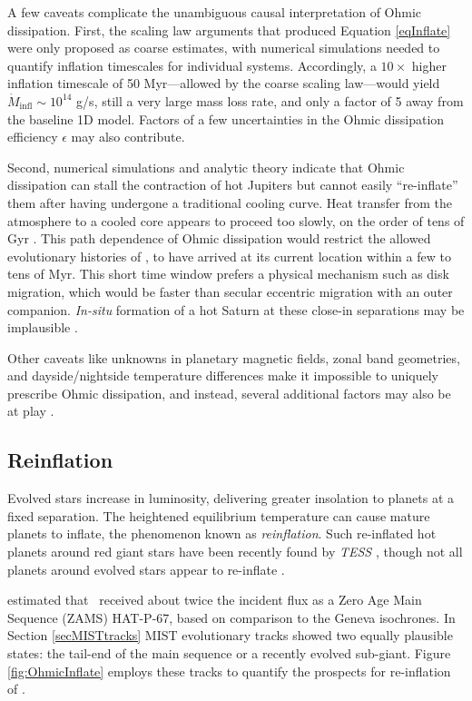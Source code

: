 \documentclass[linenumbers, twocolumn, trackchanges]{aastex631}
\newcommand{\hatpb}{\object{HAT-P-67 b}}
\begin{document}
A few caveats complicate the unambiguous causal interpretation of Ohmic dissipation.  First, the scaling law arguments that produced Equation \ref{eqInflate} were only proposed as coarse estimates, with numerical simulations needed to quantify inflation timescales for individual systems.  Accordingly, a $10\times$ higher inflation timescale of 50 Myr---allowed by the coarse scaling law---would yield $\dot{M}_\mathrm{infl}\sim10^{14}$ g/s, still a very large mass loss rate, and only a factor of 5 away from the baseline 1D model.  Factors of a few uncertainties in the Ohmic dissipation efficiency $\epsilon$ may also contribute.

Second, numerical simulations \citep{2013ApJ...763...13W} and analytic theory \citep{2016ApJ...819..116G} indicate that Ohmic dissipation can stall the contraction of hot Jupiters but cannot easily ``re-inflate'' them after having undergone a traditional cooling curve.  Heat transfer from the atmosphere to a cooled core appears to proceed too slowly, on the order of tens of Gyr \citep{2016ApJ...819..116G}.  This path dependence of Ohmic dissipation would restrict the allowed evolutionary histories of \hatpb, to have arrived at its current location within a few to tens of Myr.  This short time window prefers a physical mechanism such as disk migration, which would be faster than secular eccentric migration with an outer companion. \emph{In-situ} formation of a hot Saturn at these close-in separations may be implausible \citep{2018ARA&A..56..175D}.

Other caveats like unknowns in planetary magnetic fields, zonal band geometries, and dayside/nightside temperature differences make it impossible to uniquely prescribe Ohmic dissipation, and instead, several additional factors may also be at play \citep{2021A&A...645A..79S}.


\subsection{Reinflation}
Evolved stars increase in luminosity, delivering greater insolation to planets at a fixed separation.  The heightened equilibrium temperature can cause mature planets to inflate, the phenomenon known as \emph{reinflation}.  Such re-inflated hot planets around red giant stars have been recently found by \emph{TESS} \citep{2022AJ....163..120G,2023arXiv230306728G}, though not all planets around evolved stars appear to re-inflate \citep{2022AJ....163...53S}.

\citet{2017AJ....153..211Z} estimated that \hatpb~received about twice the incident flux as a Zero Age Main Sequence (ZAMS) HAT-P-67, based on comparison to the Geneva isochrones. In Section \ref{secMISTtracks} MIST evolutionary tracks showed two equally plausible states: the tail-end of the main sequence or a recently evolved sub-giant.  Figure \ref{fig:OhmicInflate} employs these tracks to quantify the prospects for re-inflation  of \hatpb.
\end{document}
